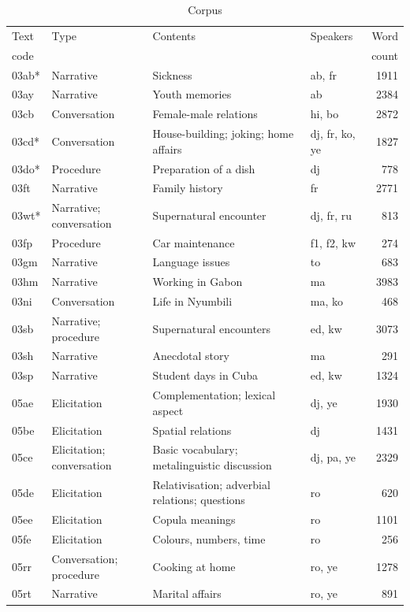 \begin{longtable}{l >{\raggedright}p{2.1cm} >{\raggedright}p{4.5cm} lr}
\caption{Corpus}\label{tab:1:1.2}\\
\lsptoprule

Text & Type & Contents & Speakers & Word\\
code & & & & count\\
\midrule
\endhead
03ab* & Narrative & Sickness & ab, fr & 1911\\
03ay & Narrative & Youth memories & ab & 2384\\
03cb & Conversation & Female-male relations & hi, bo & 2872\\
03cd* & Conversation & House-building; joking; home affairs & dj, fr, ko, ye & 1827\\
03do* & Procedure & Preparation of a dish & dj & 778\\
03ft & Narrative & Family history & fr & 2771\\
03wt* & Narrative; conversation & Supernatural encounter & dj, fr, ru & 813\\
03fp & Procedure & Car maintenance & f1, f2, kw & 274\\
03gm & Narrative & Language issues & to & 683\\
03hm & Narrative & Working in Gabon & ma & 3983\\
03ni & Conversation & Life in Nyumbili & ma, ko & 468\\
03sb & Narrative; procedure & Supernatural encounters & ed, kw & 3073\\
03sh & Narrative & Anecdotal story & ma & 291\\
03sp & Narrative & Student days in Cuba & ed, kw & 1324\\
05ae & Elicitation & Complementation; lexical aspect & dj, ye & 1930\\
05be & Elicitation & Spatial relations & dj & 1431\\
05ce & Elicitation; conversation & Basic vocabulary; metalinguistic discussion & dj, pa, ye & 2329\\
05de & Elicitation & Relativisation; adverbial relations; questions & ro & 620\\
05ee & Elicitation & Copula meanings & ro & 1101\\
05fe & Elicitation & Colours, numbers, time & ro & 256\\
05rr & Conversation; procedure & Cooking at home & ro, ye & 1278\\
05rt & Narrative & Marital affairs & ro, ye & 891\\

\end{longtable}
